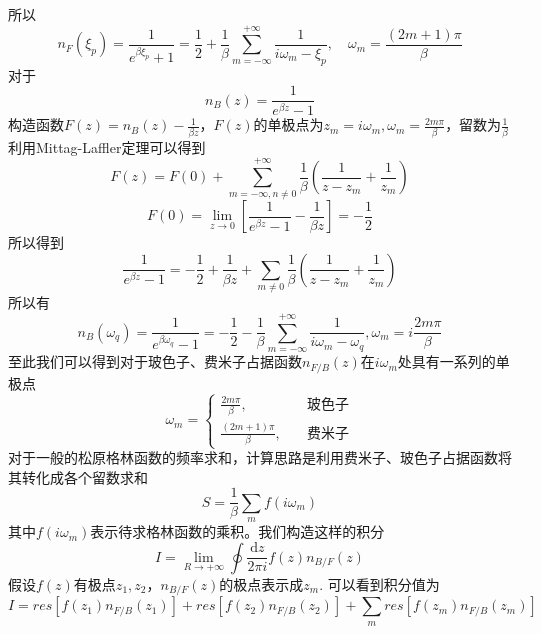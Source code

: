 \documentclass{article}
\numberwithin{equation}{subsection}
\begin{document}
所以
\begin{equation}
    n_F(\xi_p)=\frac{1}{e^{\beta\xi_p}+1}=\frac{1}{2}+\frac{1}{\beta}\sum_{m=-\infty}^{+\infty}\frac{1}{i\omega_m-\xi_p},\quad\omega_m=\frac{(2m+1)\pi}{\beta}
\end{equation}
对于
\begin{equation}
    n_B(z)=\frac{1}{e^{\beta z}-1}
\end{equation}
构造函数$F(z)=n_B(z)-\frac{1}{\beta z}$，$F(z)$的单极点为$z_m=i\omega_m,\omega_m=\frac{2m\pi}{\beta}$，留数为$\frac{1}{\beta}$
利用Mittag-Laffler定理可以得到
\begin{equation}
    F(z)=F(0)+\sum_{m=-\infty,n\neq0}^{+\infty}\frac{1}{\beta}\left(\frac{1}{z-z_m}+\frac{1}{z_m}\right)
\end{equation}
\begin{equation}
    F(0)=\lim_{z\to0}\left[\frac{1}{e^{\beta z}-1}-\frac{1}{\beta z}\right]=-\frac{1}{2}
\end{equation}
所以得到
\begin{equation}
    \frac{1}{e^{\beta z}-1}=-\frac{1}{2}+\frac{1}{\beta z}+\sum_{m\neq0}\frac{1}{\beta}\left(\frac{1}{z-z_m}+\frac{1}{z_m}\right)
\end{equation}
所以有
\begin{equation}
    n_B(\omega_q)=\frac{1}{e^{\beta\omega_q}-1}=-\frac{1}{2}-\frac{1}{\beta}\sum_{m=-\infty}^{+\infty}\frac{1}{i\omega_m-\omega_q},\omega_m=i\frac{2m\pi}{\beta}
\end{equation}
至此我们可以得到对于玻色子、费米子占据函数$n_{F/B}(z)$在$i\omega_m$处具有一系列的单极点
\begin{equation}
    \omega_m=\begin{cases}
        \frac{2m\pi}{\beta},\quad &\text{玻色子}\\
        \frac{(2m+1)\pi}{\beta},\quad&\text{费米子}
    \end{cases}
\end{equation}
对于一般的松原格林函数的频率求和，计算思路是利用费米子、玻色子占据函数将其转化成各个留数求和
\begin{equation}
    S=\frac{1}{\beta}\sum_{m}f(i\omega_m)
\end{equation}
其中$f(i\omega_m)$表示待求格林函数的乘积。我们构造这样的积分
\begin{equation}
    I=\lim_{R\to+\infty}\oint\frac{\mathrm{d}z}{2\pi i}f(z)n_{B/F}(z)
\end{equation}
假设$f(z)$有极点$z_1,z_2$，$n_{B/F}(z)$的极点表示成$z_m$. 可以看到积分值为
\begin{equation}
    I=res[f(z_1)n_{F/B}(z_1)]+res[f(z_2)n_{F/B}(z_2)]+\sum_{m}res[f(z_m)n_{F/B}(z_m)]
\end{equation}
\end{document}
